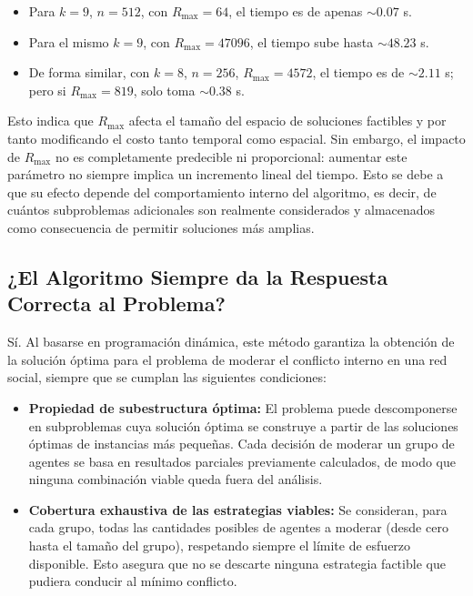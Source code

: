 \documentclass[11pt,letter]{article}
\begin{document}
\begin{itemize}
\begin{itemize}
  \item Para \(k=9\), \(n=512\), con \(R_{\max}=64\), el tiempo es de apenas \(\sim0.07\) s.
  \item Para el mismo \(k=9\), con \(R_{\max}=47096\), el tiempo sube hasta \(\sim48.23\) s.
  \item De forma similar, con \(k=8\), \(n=256\), \(R_{\max}=4572\), el tiempo es de \(\sim2.11\) s; pero si \(R_{\max}=819\), solo toma \(\sim0.38\) s.
\end{itemize}

Esto indica que \(R_{\max}\) afecta el tamaño del espacio de soluciones factibles y por tanto modificando el costo tanto temporal como espacial. Sin embargo, el impacto de \(R_{\max}\) no es completamente predecible ni proporcional: aumentar este parámetro no siempre implica un incremento lineal del tiempo. Esto se debe a que su efecto depende del comportamiento interno del algoritmo, es decir, de cuántos subproblemas adicionales son realmente considerados y almacenados como consecuencia de permitir soluciones más amplias.



    \subsection{¿El Algoritmo Siempre da la Respuesta Correcta al Problema?}

    Sí. Al basarse en programación dinámica, este método garantiza la obtención de la solución óptima para el problema de moderar el conflicto interno en una red social, siempre que se cumplan las siguientes condiciones:

    \begin{itemize}

      \item \textbf{Propiedad de subestructura óptima:}
      El problema puede descomponerse en subproblemas cuya solución óptima se construye a partir de las soluciones óptimas de instancias más pequeñas. Cada decisión de moderar un grupo de agentes se basa en resultados parciales previamente calculados, de modo que ninguna combinación viable queda fuera del análisis.

      \item \textbf{Cobertura exhaustiva de las estrategias viables:}
      Se consideran, para cada grupo, todas las cantidades posibles de agentes a moderar (desde cero hasta el tamaño del grupo), respetando siempre el límite de esfuerzo disponible. Esto asegura que no se descarte ninguna estrategia factible que pudiera conducir al mínimo conflicto.


\end{itemize}
\end{itemize}
\end{document}
